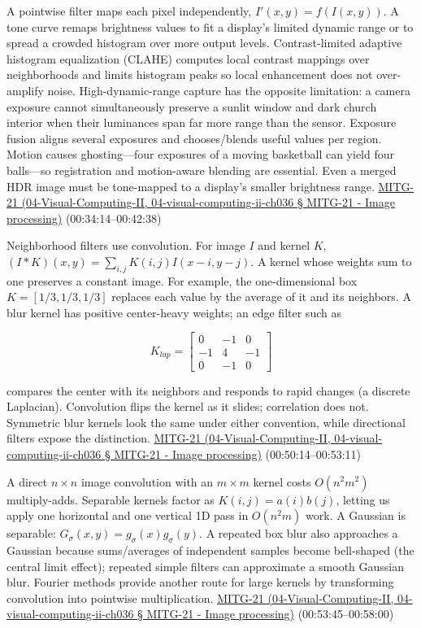 A pointwise filter maps each pixel independently, \(I'(x,y)=f(I(x,y))\). A tone curve remaps brightness values to fit a display's limited dynamic range or to spread a crowded histogram over more output levels. Contrast-limited adaptive histogram equalization (CLAHE) computes local contrast mappings over neighborhoods and limits histogram peaks so local enhancement does not over-amplify noise. High-dynamic-range capture has the opposite limitation: a camera exposure cannot simultaneously preserve a sunlit window and dark church interior when their luminances span far more range than the sensor. Exposure fusion aligns several exposures and chooses/blends useful values per region. Motion causes ghosting---four exposures of a moving basketball can yield four balls---so registration and motion-aware blending are essential. Even a merged HDR image must be tone-mapped to a display's smaller brightness range. \href{}{MITG-21 (04-Visual-Computing-II, 04-visual-computing-ii-ch036 § MITG-21 - Image processing)} (00:34:14--00:42:38)

Neighborhood filters use convolution. For image \(I\) and kernel \(K\), \((I*K)(x,y)=\sum_{i,j}K(i,j)I(x-i,y-j)\). A kernel whose weights sum to one preserves a constant image. For example, the one-dimensional box \(K=[1/3,1/3,1/3]\) replaces each value by the average of it and its neighbors. A blur kernel has positive center-heavy weights; an edge filter such as

\[
K_{lap}=\begin{bmatrix}0&-1&0\\-1&4&-1\\0&-1&0\end{bmatrix}
\]

compares the center with its neighbors and responds to rapid changes (a discrete Laplacian). Convolution flips the kernel as it slides; correlation does not. Symmetric blur kernels look the same under either convention, while directional filters expose the distinction. \href{}{MITG-21 (04-Visual-Computing-II, 04-visual-computing-ii-ch036 § MITG-21 - Image processing)} (00:50:14--00:53:11)

A direct \(n\times n\) image convolution with an \(m\times m\) kernel costs \(O(n^2m^2)\) multiply-adds. Separable kernels factor as \(K(i,j)=a(i)b(j)\), letting us apply one horizontal and one vertical 1D pass in \(O(n^2m)\) work. A Gaussian is separable: \(G_\sigma(x,y)=g_\sigma(x)g_\sigma(y)\). A repeated box blur also approaches a Gaussian because sums/averages of independent samples become bell-shaped (the central limit effect); repeated simple filters can approximate a smooth Gaussian blur. Fourier methods provide another route for large kernels by transforming convolution into pointwise multiplication. \href{}{MITG-21 (04-Visual-Computing-II, 04-visual-computing-ii-ch036 § MITG-21 - Image processing)} (00:53:45--00:58:00)

